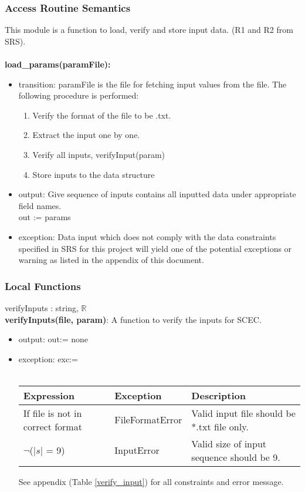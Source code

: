 \documentclass[12pt, titlepage]{article}
\begin{document}
\subsubsection{Access Routine Semantics}
This module is a function to load, verify and store input data. (R1 and R2 from SRS). \\ \\
\noindent \textbf{load\_params(paramFile):}
\begin{itemize}
\item transition:  paramFile is the file for fetching input values from the file. The following procedure is performed: 
\begin{enumerate}
    \item Verify the format of the file to be .txt. 
    \item Extract the input one by one. 
    \item Verify all inputs, verifyInput(param)
    \item Store inputs to the data structure 
\end{enumerate}
\item output: Give sequence of inputs contains all inputted data under appropriate field names. \\ 
out := params 
\item exception: Data input which does not comply with the data constraints specified in SRS for this project will yield one of the potential exceptions or warning as listed in the appendix of this document. 
\end{itemize}

\subsubsection{Local Functions}

verifyInputs : string, $\mathbb{R}$ \\ 
\textbf{verifyInputs(file, param)}: A function to verify the inputs for SCEC.   
\begin{itemize} 
    \item output: out:= none
    \item exception: exc:= \\ \\ 
     \begin{tabular}{p{5cm} p{3.5cm} p{5.5cm}}
 \hline
 \textbf{Expression} & \textbf{Exception} & \textbf{Description} \\
  \hline
    If file is not in correct format & FileFormatError & Valid input file should be *.txt file only.  \\
    $\neg $($|s|$ = 9) & InputError & Valid size of input sequence should be 9. \\ 
    \hline
 \end{tabular}
 
    See appendix (Table \ref{verify_input}) for all constraints and error message.  
    
\end{itemize}
\end{document}
